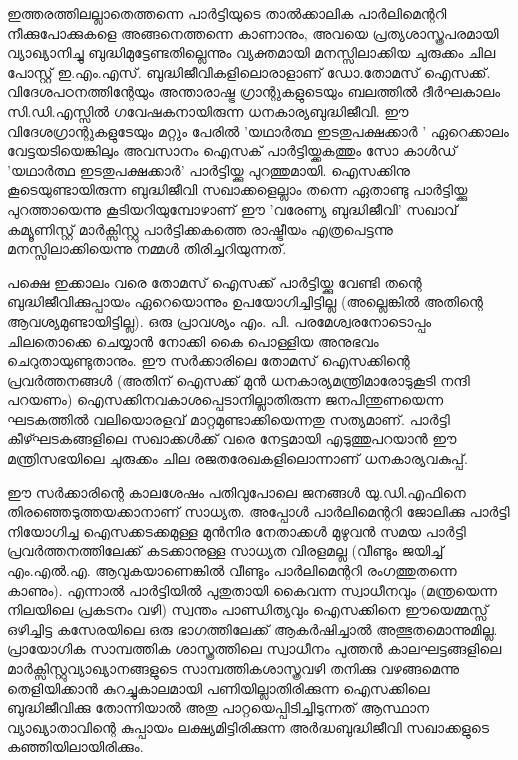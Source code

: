 ഇത്തരത്തിലല്ലാതെത്തന്നെ പാര്‍ട്ടിയുടെ താല്‍ക്കാലിക പാര്‍ലിമെന്ററി നീക്കുപോക്കുകളെ അങ്ങനെത്തന്നെ കാണാനും,
അവയെ പ്രത്യശാസ്ത്രപരമായി വ്യാഖ്യാനിച്ചു ബുദ്ധിമുട്ടേണ്ടതില്ലെന്നും വ്യക്തമായി മനസ്സിലാക്കിയ ചുരുക്കം ചില പോസ്റ്റ്
ഇ.എം.എസ്. ബുദ്ധിജീവികളിലൊരാളാണ് ഡോ.തോമസ് ഐസക്ക്. വിദേശപഠനത്തിന്റേയും അന്താരാഷ്ട്ര ഗ്രാന്റുകളുടെയും
ബലത്തില്‍ ദീര്‍ഘകാലം സി.ഡി.എസ്സില്‍ ഗവേഷകനായിരുന്ന ധനകാര്യബുദ്ധിജീവി. ഈ വിദേശഗ്രാന്റുകളുടേയും മറ്റും 
പേരില്‍ 'യഥാര്‍ത്ഥ ഇടതുപക്ഷക്കാര്‍ ' ഏറെക്കാലം വേട്ടയടിയെങ്കിലും അവസാനം ഐസക് പാര്‍ട്ടിയ്ക്കകത്തും സോ 
കാള്‍ഡ് 'യഥാര്‍ത്ഥ ഇടതുപക്ഷക്കാര്‍' പാര്‍ട്ടിയ്ക്കു പുറത്തുമായി. ഐസക്കിനു കൂടെയുണ്ടായിരുന്ന ബുദ്ധിജീവി 
സഖാക്കളെല്ലാം തന്നെ ഏതാണ്ടു പാര്‍ട്ടിയ്ക്കു പുറത്തായെന്നു കൂടിയറിയുമ്പോഴാണ് ഈ 'വരേണ്യ ബുദ്ധിജീവി' സഖാവ് 
കമ്യൂണിസ്റ്റ് മാര്‍ക്സിസ്റ്റു പാര്‍ട്ടിക്കകത്തെ രാഷ്ട്രീയം എത്രപെട്ടന്നു മനസ്സിലാക്കിയെന്നു നമ്മള്‍ തിരിച്ചറിയുന്നത്.

പക്ഷെ ഇക്കാലം വരെ തോമസ് ഐസക്ക് പാര്‍ട്ടിയ്ക്കു വേണ്ടി തന്റെ ബുദ്ധിജീവിക്കുപ്പായം ഏറെയൊന്നും ഉപയോഗിച്ചിട്ടില്ല 
(അല്ലെങ്കില്‍ അതിന്റെ ആവശ്യമുണ്ടായിട്ടില്ല). ഒരു പ്രാവശ്യം എം. പി. പരമേശ്വരനോടൊപ്പം ചിലതൊക്കെ ചെയ്യാന്‍ നോക്കി
കൈ പൊള്ളിയ അനുഭവം ചെറുതായുണ്ടുതാനും. ഈ സര്‍ക്കാരിലെ തോമസ് ഐസക്കിന്റെ പ്രവര്‍ത്തനങ്ങള്‍ (അതിന്
ഐസക്ക് മുന്‍ ധനകാര്യമന്ത്രിമാരോടുകൂടി നന്ദി പറയണം) ഐസക്കിനവകാശപ്പെടാനില്ലാതിരുന്ന ജനപിന്തുണയെന്ന 
ഘടകത്തില്‍ വലിയൊരളവ് മാറ്റമുണ്ടാക്കിയെന്നതു സത്യമാണ്. പാര്‍ട്ടി കീഴ്ഘടകങ്ങളിലെ സഖാക്കള്‍ക്ക് വരെ നേട്ടമായി
എടുത്തുപറയാന്‍ ഈ മന്ത്രിസഭയിലെ ചുരുക്കം ചില രജതരേഖകളിലൊന്നാണ് ധനകാര്യവകുപ്പ്.

ഈ സര്‍ക്കാരിന്റെ കാലശേഷം പതിവുപോലെ ജനങ്ങള്‍ യു.ഡി.എഫിനെ തിരഞ്ഞെടുത്തയക്കാനാണ് സാധ്യത. അപ്പോള്‍
പാര്‍ലിമെന്ററി ജോലിക്കു പാര്‍ട്ടി നിയോഗിച്ച ഐസക്കടക്കമുള്ള മുന്‍നിര നേതാക്കള്‍ മുഴുവന്‍ സമയ പാര്‍ട്ടി 
പ്രവര്‍ത്തനത്തിലേക്ക് കടക്കാനുള്ള സാധ്യത വിരളമല്ല (വീണ്ടും ജയിച്ച് എം.എല്‍.എ. ആവുകയാണെങ്കില്‍ വീണ്ടും 
പാര്‍ലിമെന്ററി രംഗത്തുതന്നെ കാണും). എന്നാല്‍ പാര്‍ട്ടിയില്‍ പുതുതായി കൈവന്ന സ്വാധീനവും (മന്ത്രയെന്ന നിലയിലെ 
പ്രകടനം വഴി) സ്വന്തം പാണ്ഡിത്യവും ഐസക്കിനെ ഈയെമ്മസ്സ് ഒഴിച്ചിട്ട കസേരയിലെ ഒരു ഭാഗത്തിലേക്ക് ആകര്‍ഷിച്ചാല്‍
അത്ഭുതമൊന്നുമില്ല. പ്രായോഗിക സാമ്പത്തിക ശാസ്ത്രത്തിലെ സ്വാധീനം പുത്തന്‍ കാലഘട്ടങ്ങളിലെ 
മാര്‍ക്സിസ്റ്റുവ്യാഖ്യാനങ്ങളുടെ സാമ്പത്തികശാസ്ത്രവഴി തനിക്കു വഴങ്ങമെന്നു തെളിയിക്കാന്‍ കുറച്ചുകാലമായി 
പണിയില്ലാതിരിക്കുന്ന ഐസക്കിലെ ബുദ്ധിജീവിക്കു തോന്നിയാല്‍ അതു പാറ്റയെപ്പിടിച്ചിടുന്നത് ആസ്ഥാന വ്യാഖ്യാതാവിന്റെ 
കുപ്പായം ലക്ഷ്യമിട്ടിരിക്കുന്ന അര്‍ദ്ധബുദ്ധിജീവി സഖാക്കളുടെ കഞ്ഞിയിലായിരിക്കും.

